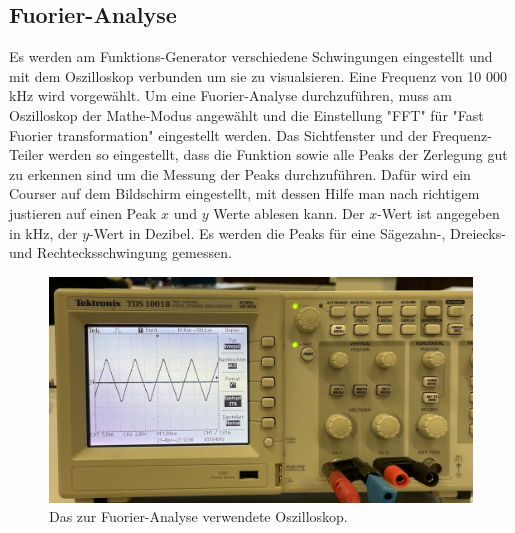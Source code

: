 \subsection{Fuorier-Analyse}
Es werden am Funktions-Generator verschiedene Schwingungen eingestellt und mit dem Oszilloskop verbunden um sie zu 
visualsieren. Eine Frequenz von 10 000\,kHz wird vorgewählt. Um eine Fuorier-Analyse durchzuführen, muss am Oszilloskop
der Mathe-Modus angewählt und die Einstellung "FFT" für "Fast Fuorier transformation" eingestellt werden. Das Sichtfenster 
und der Frequenz-Teiler werden so eingestellt, dass die Funktion sowie alle Peaks der Zerlegung gut zu erkennen sind um die Messung der Peaks
durchzuführen. Dafür wird ein Courser auf dem Bildschirm eingestellt, mit dessen Hilfe man nach richtigem justieren auf einen Peak
$x$ und $y$ Werte ablesen kann. Der $x$-Wert ist angegeben in kHz, der $y$-Wert in Dezibel. Es werden die Peaks für eine Sägezahn-,
Dreiecks- und Rechtecksschwingung gemessen.
\begin{figure}[H]
    \centering
    \includegraphics[scale=0.1]{Messdaten_Bilder/Oszilloskop.jpeg}
    \caption{Das zur Fuorier-Analyse verwendete Oszilloskop.}
    \label{fig:Oszilloskop}
\end{figure}